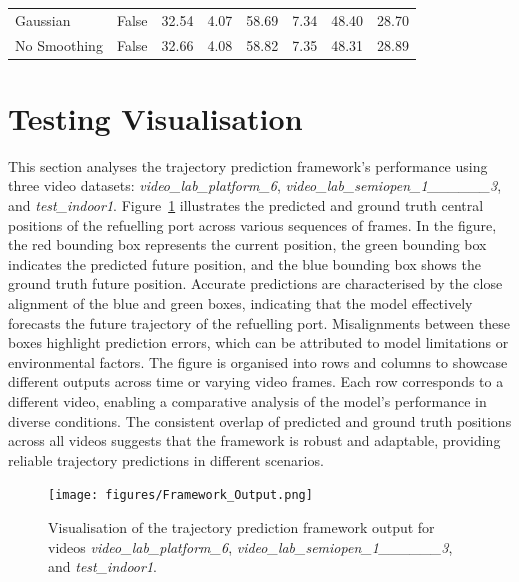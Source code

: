 \documentclass[12pt,oneside]{book} %
\begin{document}
\begin{table}[H]
\begin{adjustbox}{max width=\textwidth}
\begin{tabular}{llrrrrrr}
            Gaussian               & False        & 32.54             & 4.07              & 58.69             & 7.34              & 48.40              & 28.70              \\
            No Smoothing           & False        & 32.66             & 4.08              & 58.82             & 7.35              & 48.31              & 28.89              \\
            \bottomrule
        \end{tabular}
    \end{adjustbox}
    \label{tab:performance_metrics_video_lab_platform_6}
\end{table}

\newpage
\section{Testing Visualisation}
This section analyses the trajectory prediction framework’s performance using
three video datasets: \textit{video\_lab\_platform\_6},
\textit{video\_lab\_semiopen\_1\_\_\_\_\_\_3}, and \textit{test\_indoor1}.
Figure~\ref{fig:trajectory-prediction-test-indoor1} illustrates the predicted
and ground truth central positions of the refuelling port across various
sequences of frames. In the figure, the red bounding box represents the current
position, the green bounding box indicates the predicted future position, and
the blue bounding box shows the ground truth future position. Accurate
predictions are characterised by the close alignment of the blue and green
boxes, indicating that the model effectively forecasts the future trajectory of
the refuelling port. Misalignments between these boxes highlight prediction
errors, which can be attributed to model limitations or environmental factors.
The figure is organised into rows and columns to showcase different outputs
across time or varying video frames. Each row corresponds to a different video,
enabling a comparative analysis of the model’s performance in diverse
conditions. The consistent overlap of predicted and ground truth positions
across all videos suggests that the framework is robust and adaptable,
providing reliable trajectory predictions in different scenarios.

\begin{figure}[H]
    \centering
    \texttt{[image: figures/Framework\_Output.png]}
    \caption{Visualisation of the trajectory prediction framework output for videos \textit{video\_lab\_platform\_6}, \textit{video\_lab\_semiopen\_1\_\_\_\_\_\_3}, and \textit{test\_indoor1}. }
    \label{fig:trajectory-prediction-test-indoor1}
\end{figure}
\end{document}
